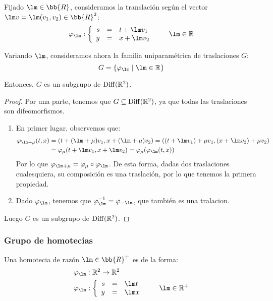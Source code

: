 \begin{prop}
    Fijado $\lm \in \bb{R}$, consideramos la translación según el vector $\lm v=\lm (v_1,v_2)\in \bb{R}^2$:
    \begin{equation*}
        \varphi_{\lm}: \left\{\begin{array}{rcl}
                s &= &t + \lm v_1 \\
                y &= &x + \lm v_2
        \end{array}\right. \qquad \lm \in \mathbb{R}
    \end{equation*}

    Variando $\lm$, consideramos ahora la familia uniparamétrica de traslaciones $G$:
    \begin{equation*}
        G = \{\varphi_{\lm} \mid \lm \in \mathbb{R}\}
    \end{equation*}

    Entonces, $G$ es un subgrupo de $\operatorname{Diff}(\mathbb{R}^2)$.

    \begin{proof}
        Por una parte, tenemos que $G\subseteq \operatorname{Diff}(\mathbb{R}^2)$, ya que todas las traslaciones son difeomorfismos. 
        \begin{enumerate}
            \item En primer lugar, observemos que:
                \begin{align*}
                    \varphi_{\lm + \mu}(t,x) &= (t+(\lm + \mu)v_1, x+(\lm+\mu)v_2) = ((t+\lm v_1)+\mu v_1, (x+\lm v_2)+\mu v_2) \\
                                             &= \varphi_\mu (t+\lm v_1, x+\lm v_2) = \varphi_\mu(\varphi_\lm(t,x))
                \end{align*}
                Por lo que $\varphi_{\lm + \mu} = \varphi_\mu \circ \varphi_\lm$. De esta forma, dadas dos traslaciones cualesquiera, su composición es una traslación, por lo que tenemos la primera propiedad.
            \item Dado $\varphi_\lm$, tenemos que $\varphi_\lm^{-1} = \varphi_{-\lm}$, que también es una tralacion.
        \end{enumerate}
        Luego $G$ es un subgrupo de $\operatorname{Diff}(\mathbb{R}^2)$.
    \end{proof}
\end{prop}

\subsubsection{Grupo de homotecias}
Una homotecia de razón $\lm\in \bb{R}^+$ es de la forma:
\begin{align*}
    \varphi_\lm&:\mathbb{R}^2 \rightarrow\mathbb{R}^2 \\
    \varphi_\lm&: \left\{\begin{array}{rcl}
            s &= &\lm t \\
            y &= &\lm x
    \end{array}\right. \qquad \lm \in \mathbb{R}^+
\end{align*}

